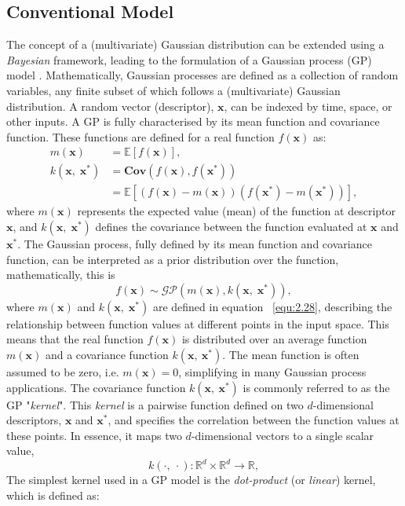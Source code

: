 \subsection{Conventional Model} \label{sec:2.3.1}
The concept of a (multivariate) Gaussian distribution can be extended using a \textit{Bayesian} framework, leading to the formulation of a Gaussian process (GP) model \cite{RasmussenW06}.
Mathematically, Gaussian processes are defined as a collection of random variables, any finite subset of which follows a (multivariate) Gaussian distribution.
A random vector (descriptor), $\mathbf{x}$, can be indexed by time, space, or other inputs.
A GP is fully characterised by its mean function and covariance function.
These functions are defined for a real function $f(\textbf{x})$ as:
\begin{equation}
    \label{equ:2.28}
    \begin{split}
     m(\mathbf{x}) &= \mathbb{E}[f(\mathbf{x})],\\
     k(\mathbf{x},\;\mathbf{x}^{*}) &=\mathbf{Cov}\left(f(\mathbf{x}), f(\mathbf{x}^{*})\right)\\
     &= \mathbb{E}[(f(\mathbf{x}) - m(\mathbf{x}))(f(\mathbf{x}^{*}) - m(\mathbf{x}^{*}))],
    \end{split}
\end{equation}
where $m(\textbf{x})$ represents the expected value (mean) of the function at descriptor $\mathbf{x}$, and $k(\textbf{x},\;\textbf{x}^{*})$ defines the covariance between the function evaluated at $\mathbf{x}$ and $\mathbf{x}^{*}$.
The Gaussian process, fully defined by its mean function and covariance function, can be interpreted as a prior distribution over the function, 
mathematically, this is
\begin{equation}
    \label{equ:2.29}
    f(\mathbf{x}) \sim \mathcal{GP} \left( m(\mathbf{x}), k(\mathbf{x},\; \mathbf{x}^{*}) \right),
\end{equation}
where $m(\textbf{x})$ and $k(\textbf{x},\;\textbf{x}^{*})$ are defined in equation ~\eqref{equ:2.28}, describing the relationship between function values at different points in the input space.
This means that the real function $f(\textbf{x})$ is distributed over an average function $m(\textbf{x})$ and a covariance function $k(\textbf{x},\:\textbf{x}^{*})$.
The mean function is often assumed to be zero, i.e. $m(\textbf{x}) = 0$, simplifying in many Gaussian process applications.
The covariance function $k(\textbf{x},\:\textbf{x}^{*})$ is commonly referred to as the GP "\textit{kernel}".
This \textit{kernel} is a pairwise function defined on two $d$-dimensional descriptors, $\mathbf{x}$ and $\mathbf{x}^{*}$, and specifies the correlation between the function values at these points.
In essence, it maps two $d$-dimensional vectors to a single scalar value, 
\[k(\cdot,\:\cdot):\mathbb{R}^{d}\times\mathbb{R}^{d}\rightarrow\mathbb{R},\]
The simplest kernel used in a GP model is the \textit{dot-product} (or \textit{linear}) kernel, which is defined as:

